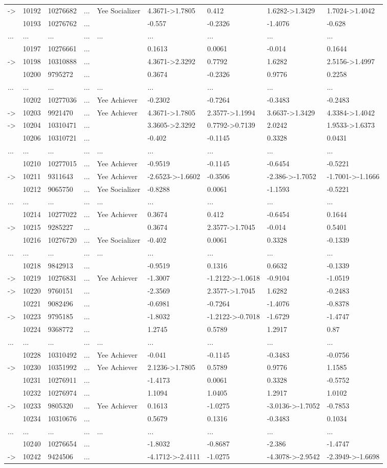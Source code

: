 \documentclass[6pt]{article}
\begin{document}
\begin{landscape}
{\begin{longtable}{lllllllll}
-\textgreater &10192&10276682&...&Yee Socializer&4.3671-\textgreater 1.7805&0.412&1.6282-\textgreater 1.3429&1.7024-\textgreater 1.4042\tabularnewline
&10193&10276762&...&&-0.557&-0.2326&-1.4076&-0.628\tabularnewline
...&...&...&...&...&...&...&...&...\tabularnewline
&10197&10276661&...&&0.1613&0.0061&-0.014&0.1644\tabularnewline
-\textgreater &10198&10310888&...&&4.3671-\textgreater 2.3292&0.7792&1.6282&2.5156-\textgreater 1.4997\tabularnewline
&10200&9795272&...&&0.3674&-0.2326&0.9776&0.2258\tabularnewline
...&...&...&...&...&...&...&...&...\tabularnewline
&10202&10277036&...&Yee Achiever&-0.2302&-0.7264&-0.3483&-0.2483\tabularnewline
-\textgreater &10203&9921470&...&Yee Achiever&4.3671-\textgreater 1.7805&2.3577-\textgreater 1.1994&3.6637-\textgreater 1.3429&4.3384-\textgreater 1.4042\tabularnewline
-\textgreater &10204&10310471&...&&3.3605-\textgreater 2.3292&0.7792-\textgreater 0.7139&2.0242&1.9533-\textgreater 1.6373\tabularnewline
&10206&10310721&...&&-0.402&-0.1145&0.3328&0.0431\tabularnewline
...&...&...&...&...&...&...&...&...\tabularnewline
&10210&10277015&...&Yee Achiever&-0.9519&-0.1145&-0.6454&-0.5221\tabularnewline
-\textgreater &10211&9311643&...&Yee Achiever&-2.6523-\textgreater -1.6602&-0.3506&-2.386-\textgreater -1.7052&-1.7001-\textgreater -1.1666\tabularnewline
&10212&9065750&...&Yee Socializer&-0.8288&0.0061&-1.1593&-0.5221\tabularnewline
...&...&...&...&...&...&...&...&...\tabularnewline
&10214&10277022&...&Yee Achiever&0.3674&0.412&-0.6454&0.1644\tabularnewline
-\textgreater &10215&9285227&...&&0.3674&2.3577-\textgreater 1.7045&-0.014&0.5401\tabularnewline
&10216&10276720&...&Yee Socializer&-0.402&0.0061&0.3328&-0.1339\tabularnewline
...&...&...&...&...&...&...&...&...\tabularnewline
&10218&9842913&...&&-0.9519&0.1316&0.6632&-0.1339\tabularnewline
-\textgreater &10219&10276831&...&Yee Achiever&-1.3007&-1.2122-\textgreater -1.0618&-0.9104&-1.0519\tabularnewline
-\textgreater &10220&9760151&...&&-2.3569&2.3577-\textgreater 1.7045&1.6282&-0.2483\tabularnewline
&10221&9082496&...&&-0.6981&-0.7264&-1.4076&-0.8378\tabularnewline
-\textgreater &10223&9795185&...&&-1.8032&-1.2122-\textgreater -0.7018&-1.6729&-1.4747\tabularnewline
&10224&9368772&...&&1.2745&0.5789&1.2917&0.87\tabularnewline
\newpage
...&...&...&...&...&...&...&...&...\tabularnewline
&10228&10310492&...&Yee Achiever&-0.041&-0.1145&-0.3483&-0.0756\tabularnewline
-\textgreater &10230&10351992&...&Yee Achiever&2.1236-\textgreater 1.7805&0.5789&0.9776&1.1585\tabularnewline
&10231&10276911&...&&-1.4173&0.0061&0.3328&-0.5752\tabularnewline
&10232&10276974&...&&1.1094&1.0405&1.2917&1.0102\tabularnewline
-\textgreater &10233&9805320&...&Yee Achiever&0.1613&-1.0275&-3.0136-\textgreater -1.7052&-0.7853\tabularnewline
&10234&10310676&...&&0.5679&0.1316&-0.3483&0.1034\tabularnewline
...&...&...&...&...&...&...&...&...\tabularnewline
&10240&10276654&...&&-1.8032&-0.8687&-2.386&-1.4747\tabularnewline
-\textgreater &10242&9424506&...&&-4.1712-\textgreater -2.4111&-1.0275&-4.3078-\textgreater -2.9542&-2.3949-\textgreater -1.6698\tabularnewline
\hline
\end{longtable}}\end{landscape}
\end{document}
